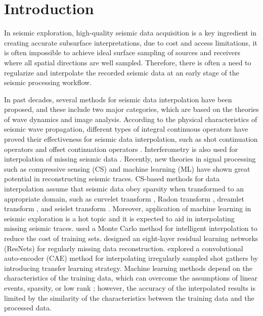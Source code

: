 \section{Introduction}

In seismic exploration, high-quality seismic data acquisition is a key
ingredient in creating accurate subsurface interpretations, due to
cost and access limitations, it is often impossible to achieve ideal
surface sampling of sources and receivers where all spatial directions
are well sampled. Therefore, there is often a need to regularize and
interpolate the recorded seismic data at an early stage of the seismic
processing workflow.

In past decades, several methods for seismic data interpolation have
been proposed, and these include two major categories, which are based
on the theories of wave dynamics and image analysis.  According to the
physical characteristics of seismic wave propagation, different types
of integral continuous operators have proved their effectiveness for
seismic data interpolation, such as shot continuation operators
\cite[]{Mazzucchelli99} and offset continuation operators
\cite[]{Fomel03}. Interferometry is also used for interpolation of
missing seismic data \cite[]{Wang09}.  Recently, new theories in
signal processing such as compressive sensing (CS) and machine
learning (ML) have shown great potential in reconstructing seismic
traces. CS-based methods for data interpolation assume that seismic
data obey sparsity when transformed to an appropriate domain, such as
curvelet transform \cite[]{Herrmann08,Naghizadeh10,Yang12,Shahidi13},
Radon transform \cite[]{Jager02,Shao17}, dreamlet transform
\cite[]{Wang15}, and seislet transform \cite[]{Liu10,Liu15}. Moreover,
application of machine learning in seismic exploration is a hot topic
and it is expected to aid in interpolating missing seismic traces.
\cite{Jia18} used a Monte Carlo method for intelligent interpolation
to reduce the cost of training sets.  \cite{Wang19} designed an
eight-layer residual learning networks (ResNets) for regularly missing
data reconstruction. \cite{Ying20} explored a convolutional
auto-encoder (CAE) method for interpolating irregularly sampled shot
gathers by introducing transfer learning strategy. Machine learning
methods depend on the characteristics of the training data, which can
overcome the assumptions of linear events, sparsity, or low rank
\cite[]{Jia17}; however, the accuracy of the interpolated results is
limited by the similarity of the characteristics between the training
data and the processed data.

